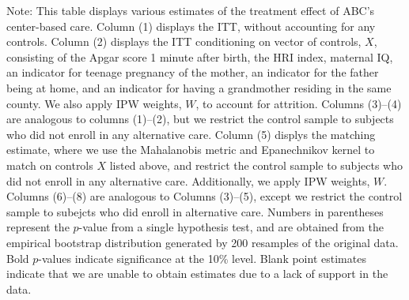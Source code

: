 \begin{table}[H]
\begin{threeparttable}
\begin{tabular}{cccccccccc}
  \hline\hline
  \end{tabular}
    \begin{tablenotes}
    \scriptsize
    \item 
Note: This table displays various estimates of the treatment effect of ABC's center-based care.
Column (1) displays the ITT, without accounting for any controls.
Column (2) displays the ITT conditioning on vector of controls, $X$, consisting of the Apgar score 1 minute after birth, the HRI index, maternal IQ, an
indicator for teenage pregnancy of the mother, an indicator for the father being at 
home, and an indicator for having a grandmother residing in the same county. We also apply IPW weights, $W$, to account for attrition.
Columns (3)--(4) are analogous to columns (1)--(2), but we restrict the control sample to subjects
who did not enroll in any alternative care.
Column (5) displys the matching estimate, where we use the Mahalanobis metric and Epanechnikov kernel
to match on controls $X$ listed above, and restrict the control sample to subjects who did not enroll
in any alternative care. Additionally, we apply IPW weights, $W$.
Columns (6)--(8) are analogous to Columns (3)--(5), except we restrict the control sample to subejcts
who did enroll in alternative care.  
Numbers in parentheses represent the $p$-value from a single hypothesis test, and are obtained from 
the empirical bootstrap distribution generated by 200 resamples of the original data. 
Bold $p$-values indicate significance at the 10\% level.
Blank point estimates indicate that we are unable to obtain estimates due to a lack of support in the data. 

    \end{tablenotes}
  \end{threeparttable}

\end{table}